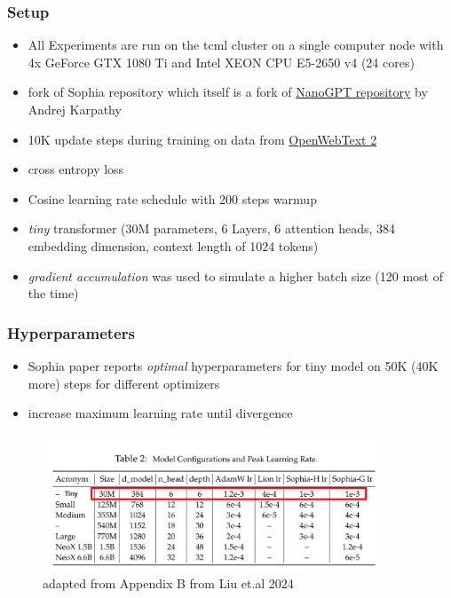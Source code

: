 \documentclass[
	11pt, %
	aspectratio=169, %
]{beamer}
\begin{document}
 \begin{frame}
	\frametitle{Setup}
	\begin{itemize}
		\item All Experiments are run on the tcml cluster on a single computer node with 4x GeForce GTX 1080 Ti and Intel XEON CPU E5-2650 v4 (24 cores)
		\item fork of Sophia repository which itself is a fork of \href{https://github.com/karpathy/nanoGPT/tree/master}{NanoGPT repository} by Andrej Karpathy
		\item 10K update steps during training on data from \href{https://openwebtext2.readthedocs.io/en/latest/}{OpenWebText 2}
		\item cross entropy loss 
		\item Cosine learning rate schedule with 200 steps warmup
		\item \textit{tiny} transformer (30M parameters, 6 Layers, 6 attention heads, 384 embedding dimension, context length of 1024 tokens)
		\item \textit{gradient accumulation} was used to simulate a higher batch size (120 most of the time)
	\end{itemize}
\end{frame}


 \begin{frame}
	\frametitle{Hyperparameters }
	\begin{itemize}
		\item Sophia paper reports \textit{optimal} hyperparameters for tiny model on 50K (40K more) steps for different optimizers
		\item increase maximum learning rate until divergence
	\end{itemize}
	\begin{figure}
		\includegraphics[width=10cm]{figures/hyperparams_from_sophia.png}
		\caption*{adapted from Appendix B from Liu et.al 2024}
	\end{figure}
\end{frame}
\end{document}
